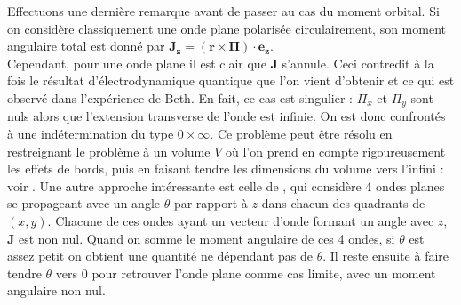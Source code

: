 Effectuons une dernière remarque avant de passer au cas du moment orbital. Si on considère classiquement une onde plane polarisée circulairement, son moment angulaire total est donné par $\bm{J_z}=(\bm{r}\times\bm{\Pi})\cdot\bm{e_z}$.\\
Cependant, pour une onde plane il est clair que $\bm{J}$ s'annule. Ceci contredit à la fois le résultat d'électrodynamique quantique que l'on vient d'obtenir et ce qui est observé dans l'expérience de Beth. En fait, ce cas est singulier : $\Pi_x$ et $\Pi_y $ sont nuls alors que l'extension transverse de l'onde est infinie. On est donc confrontés à une indétermination du type $0\times \infty$. 
Ce problème peut être résolu en restreignant le problème à un volume $V$ où l'on prend en compte rigoureusement les effets de bords, puis en faisant tendre les dimensions du volume vers l'infini : voir . Une autre approche intéressante est celle de , qui considère 4 ondes planes se propageant avec un angle $\theta$ par rapport à $z$ dans chacun des quadrants de $(x,y)$. Chacune de ces ondes ayant un vecteur d'onde formant un angle avec $z$, $\bm{J}$ est non nul. Quand on somme le moment angulaire de ces 4 ondes, si $\theta$ est assez petit on obtient une quantité ne dépendant pas de $\theta$. Il reste ensuite à faire tendre $\theta$ vers 0 pour retrouver l'onde plane comme cas limite, avec un moment angulaire non nul.

